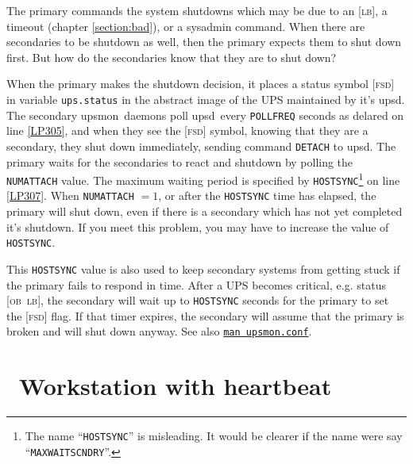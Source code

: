 \documentclass[12pt]{article}
\newlength{\headersep}\setlength{\headersep}{3mm}
\newcommand{\Hsep}{\hspace{\headersep}}
\newcommand{\newcolumn}{\vfill\eject}
\newcommand{\upsd}{\mbox{\textcolor{UPSDCOLOUR}{upsd}}}
\newcommand{\upsmon}{\mbox{\textcolor{MONCOLOUR}{upsmon}}}
\newcommand{\FSDst}{\textcolor{UPSDCOLOUR}{\textsc{fsd}}}
\newcommand{\LB}{\textcolor{UPSDCOLOUR}{\textsc{lb}}}
\newcommand{\OB}{\textcolor{UPSDCOLOUR}{\textsc{ob}}}
\newcommand{\status}[1]{\textcolor{UPSDCOLOUR}{[{#1}]}}
\newcommand{\NUTman}[1]{\href{https://networkupstools.org/docs/man/#1.html}{\texttt{man #1}}}
\begin{document}
The primary commands the system shutdowns which may be due to an \status{\LB},
a timeout (chapter \ref{section:bad}), or a sysadmin command.  When there are
secondaries to be shutdown as well, then the primary expects them to shut down
first.  But how do the secondaries know that they are to shut down?

When the primary makes the shutdown decision, it places a status
symbol \status{\FSDst} in variable \texttt{ups.status} in the abstract
image of the UPS maintained by it's \upsd.  The secondary
\upsmon\ daemons poll \upsd\ every \texttt{POLLFREQ} seconds as
delared on line \ref{LP305}, and when they see the \status{\FSDst}
symbol, knowing that they are a secondary, they shut down immediately,
sending command \texttt{DETACH} to \upsd.  The primary waits for the
secondaries to react and shutdown by polling the \texttt{NUMATTACH}
value.  The maximum waiting period is specified by
\texttt{HOSTSYNC}\footnote{The name ``\texttt{HOSTSYNC}'' is
misleading.  It would be clearer if the name were say
``\texttt{MAXWAITSCNDRY}''.} on line \ref{LP307}.  When
\texttt{NUMATTACH} $=1$, or after the \texttt{HOSTSYNC} time has
elapsed, the primary will shut down, even if there is a secondary
which has not yet completed it's shutdown.  If you meet this problem,
you may have to increase the value of \texttt{HOSTSYNC}.

This \texttt{HOSTSYNC} value is also used to keep secondary systems
from getting stuck if the primary fails to respond in time. After a
UPS becomes critical, e.g. status \status{\OB\ \LB}, the secondary
will wait up to \texttt{HOSTSYNC} seconds for the primary to set the
\status{\FSDst} flag. If that timer expires, the secondary will assume
that the primary is broken and will shut down anyway.  See also
\NUTman{upsmon.conf}.

\vspace*{\fill}

\begin{center}
\end{center}

\vspace*{\fill}



\newcolumn
\section{\Hsep\ Workstation with heartbeat}\label{heartbeat}
\end{document}
